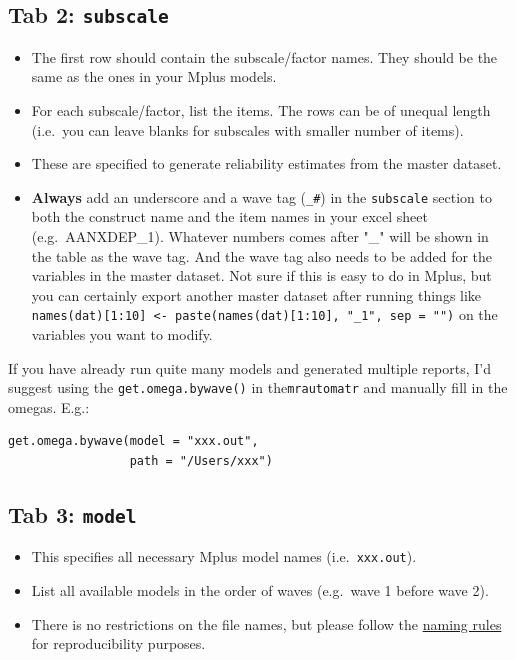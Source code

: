 \documentclass[
]{book}
\begin{document}
\hypertarget{tab-2-subscale}{%
\subsection{\texorpdfstring{Tab 2: \texttt{subscale}}{Tab 2: subscale}}\label{tab-2-subscale}}

\begin{itemize}
\item
  The first row should contain the subscale/factor names. They should be the same as the ones in your Mplus models.
\item
  For each subscale/factor, list the items. The rows can be of unequal length (i.e.~you can leave blanks for subscales with smaller number of items).
\item
  These are specified to generate reliability estimates from the master dataset.
\item
  \textbf{Always} add an underscore and a wave tag (\texttt{\_\#}) in the \texttt{subscale} section to both the construct name and the item names in your excel sheet (e.g.~AANXDEP\_1). Whatever numbers comes after "\_" will be shown in the table as the wave tag. And the wave tag also needs to be added for the variables in the master dataset. Not sure if this is easy to do in Mplus, but you can certainly export another master dataset after running things like \texttt{names(dat){[}1:10{]}\ \textless{}-\ paste(names(dat){[}1:10{]},\ "\_1",\ sep\ =\ "")} on the variables you want to modify.
\end{itemize}

If you have already run quite many models and generated multiple reports, I'd suggest using the \texttt{get.omega.bywave()} in the\texttt{mrautomatr} and manually fill in the omegas. E.g.:

\begin{verbatim}
get.omega.bywave(model = "xxx.out", 
                 path = "/Users/xxx")
\end{verbatim}

\hypertarget{tab-3-model}{%
\subsection{\texorpdfstring{Tab 3: \texttt{model}}{Tab 3: model}}\label{tab-3-model}}

\begin{itemize}
\item
  This specifies all necessary Mplus model names (i.e.~\texttt{xxx.out}).
\item
  List all available models in the order of waves (e.g.~wave 1 before wave 2).
\item
  There is no restrictions on the file names, but please follow the \href{https://nyu.box.com/s/ate5l7wmw164u7xjg3g8x1vrfhwnt0ax}{naming rules} for reproducibility purposes.
\end{itemize}
\end{document}
